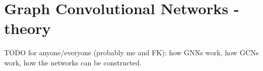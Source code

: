 
\chapter{Graph Convolutional Networks - theory}

TODO for anyone/everyone (probably me and FK): how GNNs work, how GCNs work, how the networks can be constructed.
